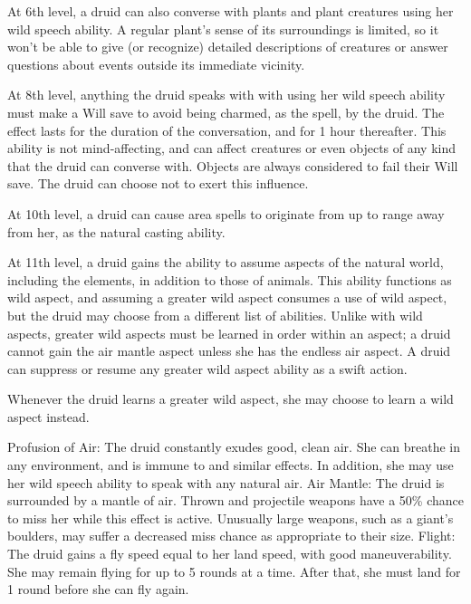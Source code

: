  At 6th level, a druid can also converse with plants and plant creatures using her wild speech ability. A regular plant's sense of its surroundings is limited, so it won't be able to give (or recognize) detailed descriptions of creatures or answer questions about events outside its immediate vicinity.

 At 8th level, anything the druid speaks with with using her wild speech ability must make a Will save to avoid being charmed, as the  spell, by the druid. The effect lasts for the duration of the conversation, and for 1 hour thereafter. This ability is not mind-affecting, and can affect creatures or even objects of any kind that the druid can converse with. Objects are always considered to fail their Will save.  The druid can choose not to exert this influence.

 At 10th level, a druid can cause area spells to originate from up to \rngclose range away from her, as the natural casting ability.

 At 11th level, a druid gains the ability to assume aspects of the natural world, including the elements, in addition to those of animals. This ability functions as wild aspect, and assuming a greater wild aspect consumes a use of wild aspect, but the druid may choose from a different list of abilities. Unlike with wild aspects, greater wild aspects must be learned in order within an aspect; a druid cannot gain the air mantle aspect unless she has the endless air aspect. A druid can suppress or resume any greater wild aspect ability as a swift action.

Whenever the druid learns a greater wild aspect, she may choose to learn a wild aspect instead.
\begin{greaterwildaspect}
\wilditem Profusion of Air: The druid constantly exudes good, clean air. She can breathe in any environment, and is immune to  and similar effects. In addition, she may use her wild speech ability to speak with any natural air.
\wilditem Air Mantle: The druid is surrounded by a mantle of air. Thrown and projectile weapons have a 50\% chance to miss her while this effect is active. Unusually large weapons, such as a giant's boulders, may suffer a decreased miss chance as appropriate to their size.
\wilditemplus Flight: The druid gains a fly speed equal to her land speed, with good maneuverability. She may remain flying for up to 5 rounds at a time. After that, she must land for 1 round before she can fly again.
\end{greaterwildaspect}

